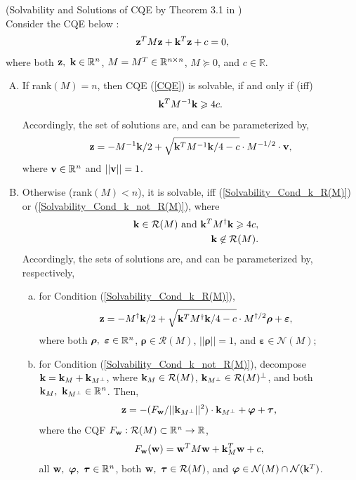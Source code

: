 \documentclass{imaman}
\newcommand{\beq}{\begin{eqnarray}}
\newcommand{\eeq}{\end{eqnarray}}
\newcommand{\bfw}{{\bf w}}
\newcommand{\bfk}{{\bf k}}
\newcommand{\bfz}{{\bf z}}
\newcommand{\bfv}{{\bf v}}
\newcommand{\bfrho}{{\boldsymbol \rho}}
\newcommand{\bftau}{{\boldsymbol \tau}}
\newcommand{\bfvarepsilon}{{\boldsymbol \varepsilon}}
\newcommand{\bfvarphi}{{\boldsymbol \varphi}}
\newcommand{\calN}{{\mathcal N}}
\newcommand{\calR}{{\mathcal R}}
\newcommand{\itn}{{\it n}}
\numberwithin{equation}{section}
\begin{document}
\begin{lemma} (Solvability and Solutions of CQE by Theorem {\rm 3.1} in {\rm \cite{LiLiHs:20}})\\
Consider the CQE below {\rm \citep{Lu(Ye):03(16)}}:
\beq
\bfz^TM\bfz+\bfk^T\bfz+c=0,
\label{CQE}
\eeq
where both $\bfz,~\bfk\in\mathbb{R}^{\it n}$, $M=M^T\in\mathbb{R}^{{\it n}\times {\it n}}$, $M\succeq 0$, and $c\in\mathbb{R}$.
\begin{enumerate}[A)]
\item\label{Lem_Solutions_n} If rank$(M)=n$, then CQE {\rm(\ref{CQE})} is solvable, if and only if (iff)
    \beq
    \bfk^TM^{-1}\bfk\ge 4c.
    \label{Solvability_Cond_n}
    \eeq
    Accordingly, the set of solutions are, and can be parameterized by,
    \beq
    \bfz=-M^{-1}\bfk/2+\sqrt{\bfk^TM^{-1}\bfk/4-c}\cdot M^{-1/2}\cdot \bfv,
    \label{Solution_n}
    \eeq
    where $\bfv\in\mathbb{R}^{\it n}$ and $||\bfv||=1$.
\item\label{Lem_Solutions_r} Otherwise (rank$(M)<n$), it is solvable, iff {\rm(\ref{Solvability_Cond_k_R(M)})} or {\rm(\ref{Solvability_Cond_k_not_R(M)})}, where
    \beq
    &&\bfk\in \calR(M)~\mbox{and}~\bfk^TM^\dagger\bfk\ge 4c,\label{Solvability_Cond_k_R(M)}\\
    &&\bfk\not\in \calR(M).\label{Solvability_Cond_k_not_R(M)}
    \eeq
    Accordingly, the sets of solutions are, and can be parameterized by, respectively,
    \begin{enumerate}[a)]
    \item\label{Lem_Solutions_r_k_R(M)} for Condition {\rm(\ref{Solvability_Cond_k_R(M)})},
        \beq
        \bfz=-M^\dagger\bfk/2+\sqrt{\bfk^TM^\dagger \bfk/4-c}\cdot M^{\dagger/2}\bfrho+\bfvarepsilon,~~
        \label{Solution_k_R(M)}
        \eeq
        where both $\bfrho,~\bfvarepsilon\in\mathbb{R}^{\it n}$, $\bfrho\in \calR(M)$, $||\bfrho||=1$, and $\bfvarepsilon\in \calN(M)$;
    \item\label{Lem_Solutions_r_k_not_R(M)} for Condition {\rm(\ref{Solvability_Cond_k_not_R(M)})}, decompose $\bfk=\bfk_M+\bfk_{M^\perp}$, where $\bfk_M\in \calR(M)$, $\bfk_{M^\perp}\in \calR(M)^\perp$, and both $\bfk_M,~\bfk_{M^\perp}\in\mathbb{R}^\itn$. Then,
        \beq
        \bfz=-(F_\bfw/||\bfk_{M^\perp}||^2)\cdot\bfk_{M^\perp}+\bfvarphi+\bftau,
        \label{Solution_k_not_R(M)}
        \eeq
        where the CQF $F_\bfw: \calR(M)\subset\mathbb{R}^\itn\rightarrow\mathbb{R}$,
        \beq
        F_\bfw(\bfw)=\bfw^TM\bfw+\bfk_M^T\bfw+c,
        \label{CQF_Solution_k_not_R(M)}
        \eeq
        all $\bfw,~\bfvarphi,~\bftau\in\mathbb{R}^{\it n}$, both $\bfw,~\bftau\in \calR(M)$, and $\bfvarphi\in \calN(M)\cap \calN(\bfk^T)$.
    \end{enumerate}
\end{enumerate}
\label{Lem_Solutions}
\end{lemma}
\end{document}

